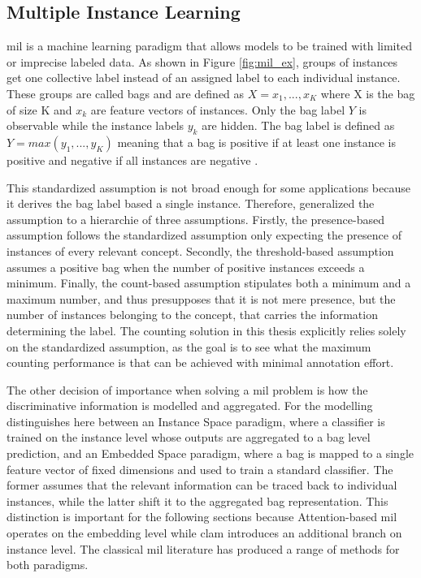 \documentclass[12pt,parskip = half, DIV=classic,listof=totoc]{scrartcl}
\begin{document}
		\subsection{Multiple Instance Learning}
			\acf{mil} is a machine learning paradigm that allows models to be trained with limited or imprecise labeled data. As shown in Figure \ref{fig:mil_ex}, groups of instances get one collective
			label instead of an assigned label to each individual instance. These groups are called bags and are defined as $X = {x_1,...,x_K}$ where X is the 
			bag of size K and $x_k$ are feature vectors of instances. Only the bag label $Y$ is observable while the instance labels $y_k$ are hidden. 
			The bag label is defined as $Y = max(y_1,...,y_K)$ meaning that a bag is positive if at least one instance is positive and negative if all instances are negative \cite{dietterichSolvingMultipleInstance1997}.

			This standardized assumption is not broad enough for some applications because it derives the bag label based a single instance. Therefore, \textcite{weidmannTwoLevelLearningMethod2003} 
			generalized the assumption to a hierarchie of three assumptions. Firstly, the presence-based assumption follows the standardized assumption only expecting the presence of instances of every
			relevant concept. Secondly, the threshold-based assumption assumes a positive bag when the number of positive instances exceeds a minimum. 
			Finally, the count-based assumption stipulates both a minimum and a maximum number, and thus presupposes that it is not mere presence, but the number of instances belonging to the concept, 
			that carries the information determining the label. The counting solution in this thesis explicitly relies solely on the standardized assumption, as the goal is to see what the maximum 
			counting performance is that can be achieved with minimal annotation effort.

			The other decision of importance when solving a \ac{mil} problem is how the discriminative information is modelled and aggregated. For the modelling \textcite{amoresMultipleInstanceClassification2013}
			distinguishes here between an Instance Space paradigm, where a classifier is trained on the instance level whose outputs are aggregated to a bag level prediction, and
			an Embedded Space paradigm, where a bag is mapped to a single feature vector of fixed dimensions and used to train a standard classifier.
			The former assumes that the relevant information can be traced back to individual instances, while the latter shift it to the aggregated bag representation.
			This distinction is important for the following sections because Attention-based \ac{mil} operates on the embedding level while \ac{clam} introduces an additional branch on instance level.
			The classical \ac{mil} literature has produced a range of methods for both paradigms. 
\end{document}
